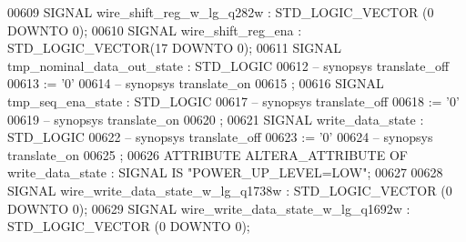 \begin{DoxyCode}
{00609      \textcolor{keywordflow}{SIGNAL}  \textcolor{vhdlchar}{wire_shift_reg_w_lg_q282w}  \textcolor{vhdlchar}{:}   \textcolor{comment}{STD\_LOGIC\_VECTOR} \textcolor{vhdlchar}{(}\textcolor{vhdllogic}{}\textcolor{vhdllogic}{0} \textcolor{keywordflow}{DOWNTO} \textcolor{vhdllogic}{}\textcolor{vhdllogic}{0}\textcolor{vhdlchar}{)};
00610      \textcolor{keywordflow}{SIGNAL}  \textcolor{vhdlchar}{wire_shift_reg_ena} \textcolor{vhdlchar}{:}   \textcolor{comment}{STD\_LOGIC\_VECTOR}\textcolor{vhdlchar}{(}\textcolor{vhdllogic}{}\textcolor{vhdllogic}{17} \textcolor{keywordflow}{DOWNTO} \textcolor{vhdllogic}{}\textcolor{vhdllogic}{0}\textcolor{vhdlchar}{)};
00611      \textcolor{keywordflow}{SIGNAL}  \textcolor{vhdlchar}{tmp_nominal_data_out_state} \textcolor{vhdlchar}{:}   \textcolor{comment}{STD\_LOGIC}
00612 \textcolor{keyword}{     -- synopsys translate\_off}
00613       \textcolor{vhdlchar}{:=} \textcolor{vhdlchar}{'}\textcolor{vhdllogic}{}\textcolor{vhdllogic}{0}\textcolor{vhdlchar}{'}
00614 \textcolor{keyword}{     -- synopsys translate\_on}
00615      ;
00616      \textcolor{keywordflow}{SIGNAL}  \textcolor{vhdlchar}{tmp_seq_ena_state}  \textcolor{vhdlchar}{:}   \textcolor{comment}{STD\_LOGIC}
00617 \textcolor{keyword}{     -- synopsys translate\_off}
00618       \textcolor{vhdlchar}{:=} \textcolor{vhdlchar}{'}\textcolor{vhdllogic}{}\textcolor{vhdllogic}{0}\textcolor{vhdlchar}{'}
00619 \textcolor{keyword}{     -- synopsys translate\_on}
00620      ;
00621      \textcolor{keywordflow}{SIGNAL}  \textcolor{vhdlchar}{write_data_state}   \textcolor{vhdlchar}{:}   \textcolor{comment}{STD\_LOGIC}
00622 \textcolor{keyword}{     -- synopsys translate\_off}
00623       \textcolor{vhdlchar}{:=} \textcolor{vhdlchar}{'}\textcolor{vhdllogic}{}\textcolor{vhdllogic}{0}\textcolor{vhdlchar}{'}
00624 \textcolor{keyword}{     -- synopsys translate\_on}
00625      ;
00626      \textcolor{keywordflow}{ATTRIBUTE} \textcolor{vhdlchar}{ALTERA_ATTRIBUTE} \textcolor{keywordflow}{OF} \textcolor{vhdlchar}{write_data_state} \textcolor{vhdlchar}{:} \textcolor{keywordflow}{SIGNAL} \textcolor{keywordflow}{IS} \textcolor{keyword}{"POWER\_UP\_LEVEL=LOW"};
00627 
00628      \textcolor{keywordflow}{SIGNAL}  \textcolor{vhdlchar}{wire_write_data_state_w_lg_q1738w}  \textcolor{vhdlchar}{:}   \textcolor{comment}{STD\_LOGIC\_VECTOR} \textcolor{vhdlchar}{(}\textcolor{vhdllogic}{}\textcolor{vhdllogic}{0} \textcolor{keywordflow}{DOWNTO} \textcolor{vhdllogic}{}\textcolor{vhdllogic}{0}\textcolor{vhdlchar}{)};
00629      \textcolor{keywordflow}{SIGNAL}  \textcolor{vhdlchar}{wire_write_data_state_w_lg_q1692w}  \textcolor{vhdlchar}{:}   \textcolor{comment}{STD\_LOGIC\_VECTOR} \textcolor{vhdlchar}{(}\textcolor{vhdllogic}{}\textcolor{vhdllogic}{0} \textcolor{keywordflow}{DOWNTO} \textcolor{vhdllogic}{}\textcolor{vhdllogic}{0}\textcolor{vhdlchar}{)};
}
\end{DoxyCode}
